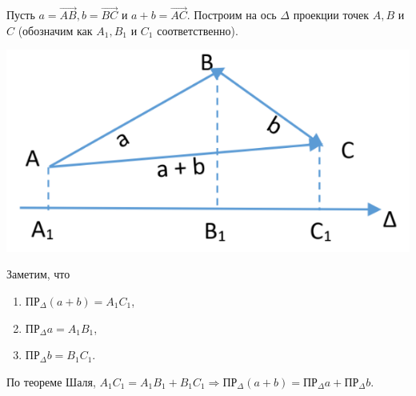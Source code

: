 \begin{enumerate}
	\begin{Proof}
		Пусть $a = \overrightarrow{AB}, b = \overrightarrow{BC}$ и $a + b = \overrightarrow{AC}$. Построим на ось $\Delta$ проекции точек $A, B$ и $C$ (обозначим как $A_1, B_1$ и $C_1$ соответственно).
		\begin{center}
			\includegraphics[scale=0.5]{images/triangle2_3.png}
		\end{center}
		Заметим, что
		\begin{enumerate}
			\item $\text{ПР}_\Delta (a+b) = A_1 C_1$,
			\item $\text{ПР}_\Delta a = A_1 B_1$,
			\item $\text{ПР}_\Delta b = B_1 C_1$.
		\end{enumerate}
		По теореме Шаля, $A_1C_1 = A_1 B_1 + B_1 C_1\Rightarrow \text{ПР}_\Delta(a+b) = \text{ПР}_\Delta a + \text{ПР}_\Delta b$.
	\end{Proof}
\end{enumerate}
